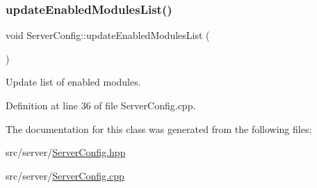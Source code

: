 \subsubsection{\texorpdfstring{update\+Enabled\+Modules\+List()}{updateEnabledModulesList()}}
{\footnotesize\ttfamily void Server\+Config\+::update\+Enabled\+Modules\+List (\begin{DoxyParamCaption}{ }\end{DoxyParamCaption})}



Update list of enabled modules. 



Definition at line 36 of file Server\+Config.\+cpp.



The documentation for this class was generated from the following files\+:\begin{DoxyCompactItemize}
\item 
src/server/\hyperlink{_server_config_8hpp}{Server\+Config.\+hpp}\item 
src/server/\hyperlink{_server_config_8cpp}{Server\+Config.\+cpp}\end{DoxyCompactItemize}
